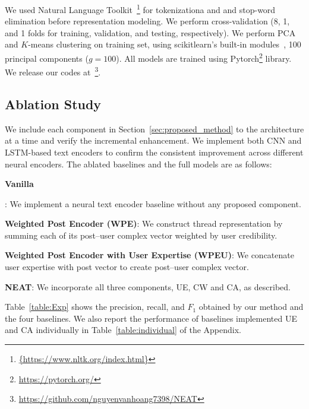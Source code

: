 \documentclass{bmcart}
\begin{document}
We used Natural Language Toolkit~\footnote{\scriptsize{\url{{https://www.nltk.org/index.html}}}} for tokenizationa and and stop-word elimination before representation modeling. 
We perform cross-validation (8, 1, and 1 folds for training, validation, and testing, respectively). We perform PCA and $K$-means clustering on training set, using scikitlearn's built-in modules~\cite{scikit-learn}, 
100 principal components ($g=100$). All models are trained using Pytorch\footnote{\scriptsize{\url{https://pytorch.org/}}} library. We release our codes at~\footnote{\scriptsize{\url{https://github.com/nguyenvanhoang7398/NEAT}}}.

\subsection{Ablation Study}

We include each component in Section~\ref{sec:proposed_method} to the architecture at a time and verify the incremental enhancement. We implement both CNN and LSTM-based text encoders to confirm the consistent improvement across different neural encoders. The ablated baselines and the full models are as follows: 

\begin{itemize}
  {\item{\textbf{Vanilla}}}: We implement a neural text encoder baseline without any proposed component.
  
\item{\textbf{Weighted Post Encoder (WPE)}}: We construct thread representation by summing each of its post--user complex vector weighted by user credibility.

\item{\textbf{Weighted Post Encoder with User Expertise (WPEU)}}: We concatenate user expertise with post vector to create post--user complex vector.

\item{\textbf{NEAT}}: We incorporate all three components, UE, CW and CA, as described.

\end{itemize}


Table~\ref{table:Exp} shows the precision, recall, and $F_{1}$ obtained by our method and the four baselines. We also report the performance of baselines implemented UE and CA individually in Table~\ref{table:individual} of the Appendix.
\end{document}
